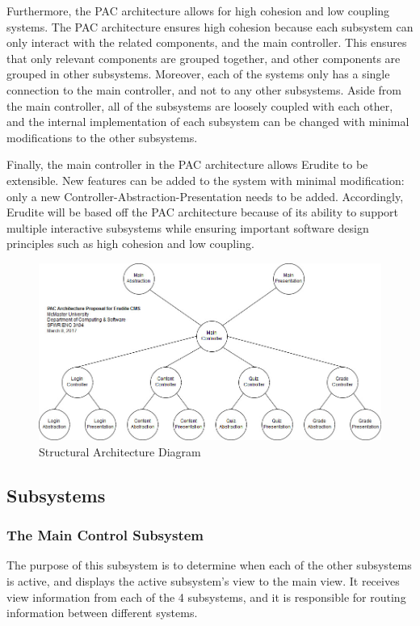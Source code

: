 \documentclass[]{article}
\begin{document}
Furthermore, the PAC architecture allows for high cohesion and low coupling 
systems. The PAC architecture ensures high cohesion because each subsystem can 
only interact with the related components, and the main controller. This ensures 
that only relevant components are grouped together, and other components are 
grouped in other subsystems. Moreover, each of the systems only has a single 
connection to the main controller, and not to any other subsystems. Aside from 
the main controller, all of the subsystems are loosely coupled with each other, 
and the internal implementation of each subsystem can be changed with minimal 
modifications to the other subsystems.

Finally, the main controller in the PAC architecture allows Erudite to be 
extensible. New features can be added to the system with minimal modification: 
only a new Controller-Abstraction-Presentation needs to be added. Accordingly, 
Erudite will be based off the PAC architecture because of its ability to support 
multiple interactive subsystems while ensuring important software design 
principles such as high cohesion and low coupling.

{
  \begin{figure}[h]
  \centering
    \includegraphics[scale=0.5]{A2_Assets/Structural_Class_Diagram_v3.jpg}
  \caption{Structural Architecture Diagram}
  \end{figure}
}

\subsection{Subsystems}
\label{sub:subsystems}
\subsubsection{The Main Control Subsystem}
The purpose of this subsystem is to determine when each of the other subsystems is active, and displays the active subsystem's view to the main view. It receives view information from each of the 4 subsystems, and it is responsible for routing information between different systems.
\end{document}
